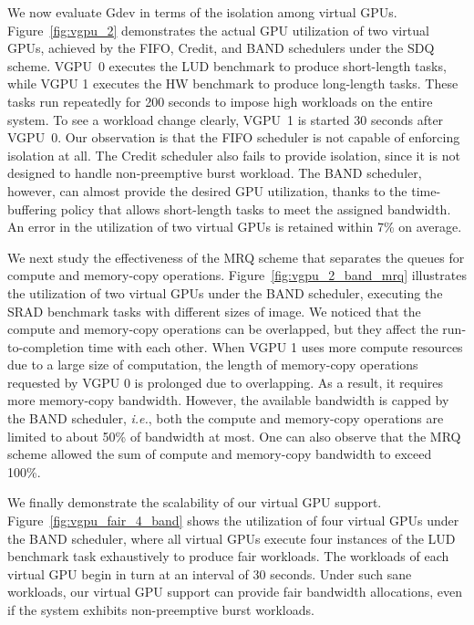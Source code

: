 We now evaluate Gdev in terms of the isolation among virtual GPUs.
Figure~\ref{fig:vgpu_2} demonstrates the actual GPU utilization of two
virtual GPUs, achieved by the FIFO, Credit, and BAND schedulers under
the SDQ scheme.
VGPU~0 executes the LUD benchmark to produce short-length tasks, while
VGPU 1 executes the HW benchmark to produce long-length tasks.
These tasks run repeatedly for 200 seconds to impose high workloads on
the entire system.
To see a workload change clearly, VGPU~1 is started 30 seconds after
VGPU~0.
Our observation is that the FIFO scheduler is not capable of enforcing
isolation at all.
The Credit scheduler also fails to provide isolation, since it is not
designed to handle non-preemptive burst workload.
The BAND scheduler, however, can almost provide the desired GPU
utilization, thanks to the time-buffering policy that allows
short-length tasks to meet the assigned bandwidth.
An error in the utilization of two virtual GPUs is retained
within 7\% on average.

We next study the effectiveness of the MRQ scheme that separates the
queues for compute and memory-copy operations.
Figure~\ref{fig:vgpu_2_band_mrq} illustrates the utilization of two
virtual GPUs under the BAND scheduler, executing the SRAD benchmark
tasks with different sizes of image.
We noticed that the compute and memory-copy operations can be
overlapped, but they affect the run-to-completion time with each other.
When VGPU 1 uses more compute resources due to a large size of
computation, the length of memory-copy operations requested by VGPU 0 is
prolonged due to overlapping.
As a result, it requires more memory-copy bandwidth.
However, the available bandwidth is capped by the BAND scheduler,
\textit{i.e.}, both the compute and memory-copy operations are limited 
to about 50\% of bandwidth at most.
One can also observe that the MRQ scheme allowed the sum of compute and
memory-copy bandwidth to exceed 100\%.

We finally demonstrate the scalability of our virtual GPU support.
Figure~\ref{fig:vgpu_fair_4_band} shows the utilization of four virtual
GPUs under the BAND scheduler, where all virtual GPUs execute four
instances of the LUD benchmark task exhaustively to produce fair
workloads.
The workloads of each virtual GPU begin in turn at an interval of 30
seconds.
Under such sane workloads, our virtual GPU support can provide fair
bandwidth allocations, even if the system exhibits non-preemptive burst
workloads.

